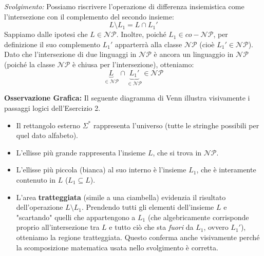\textit{Svolgimento:}
Possiamo riscrivere l'operazione di differenza insiemistica come l'intersezione con il complemento del secondo insieme:
$$ L \setminus L_1 = L \cap L_1' $$
Sappiamo dalle ipotesi che $L \in \mathcal{NP}$. Inoltre, poiché $L_1 \in co-\mathcal{NP}$, per definizione il suo complemento $L_1'$ apparterrà alla classe $\mathcal{NP}$ (cioè $L_1' \in \mathcal{NP}$).
Dato che l'intersezione di due linguaggi in $\mathcal{NP}$ è ancora un linguaggio in $\mathcal{NP}$ (poiché la classe $\mathcal{NP}$ è chiusa per l'intersezione), otteniamo:
$$ \underbrace{L}_{\in \mathcal{NP}} \cap \underbrace{L_1'}_{\in \mathcal{NP}} \in \mathcal{NP} $$

\vspace{0.4cm}
\textbf{Osservazione Grafica:}
Il seguente diagramma di Venn illustra visivamente i passaggi logici dell'Esercizio 2. 
\begin{itemize}
    \item Il rettangolo esterno \textbf{$\Sigma^*$} rappresenta l'universo (tutte le stringhe possibili per quel dato alfabeto).
    \item L'ellisse più grande rappresenta l'insieme \textbf{$L$}, che si trova in $\mathcal{NP}$.
    \item L'ellisse più piccola (bianca) al suo interno è l'insieme \textbf{$L_1$}, che è interamente contenuto in $L$ ($L_1 \subseteq L$).
    \item L'area \textbf{tratteggiata} (simile a una ciambella) evidenzia il risultato dell'operazione $L \setminus L_1$. Prendendo tutti gli elementi dell'insieme $L$ e "scartando" quelli che appartengono a $L_1$ (che algebricamente corrisponde proprio all'intersezione tra $L$ e tutto ciò che sta \textit{fuori} da $L_1$, ovvero $L_1'$), otteniamo la regione tratteggiata. Questo conferma anche visivamente perché la scomposizione matematica usata nello svolgimento è corretta.
\end{itemize}

